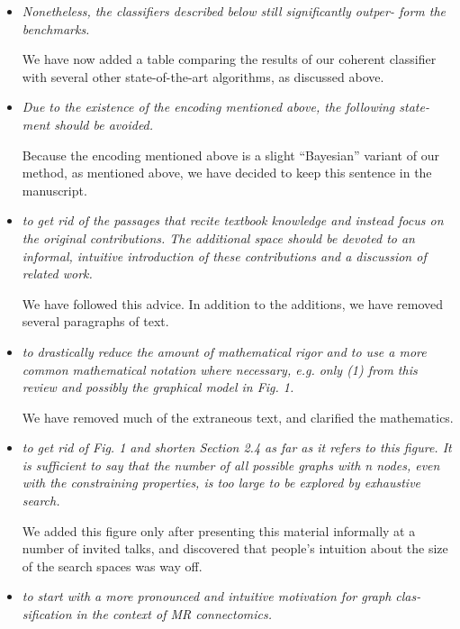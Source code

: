 \documentclass[11pt]{article}
\begin{document}
\begin{itemize}
	.
	
	
	\item \emph{Nonetheless, the classifiers described below still significantly outper- form the benchmarks.}
	
	We have now added a table comparing the results of our coherent classifier with several other state-of-the-art algorithms, as discussed above.
	
	\item \emph{Due to the existence of the encoding mentioned above, the following state- ment should be avoided.}
	
		Because the encoding mentioned above is a slight ``Bayesian'' variant of our method, as mentioned above, we have decided to keep this sentence in the manuscript.
		
	\item \emph{to get rid of the passages that recite textbook knowledge and instead focus on the original contributions. The additional space should be devoted to an informal, intuitive introduction of these contributions and a discussion of related work.}
	
	We have followed this advice.  In addition to the additions, we have removed several paragraphs of text.
	
	\item \emph{to drastically reduce the amount of mathematical rigor and to use a more common mathematical notation where necessary, e.g. only (1) from this review and possibly the graphical model in Fig. 1.}
	
	We have removed much of the extraneous text, and clarified the mathematics.
	
	\item \emph{to get rid of Fig. 1 and shorten Section 2.4 as far as it refers to this figure. It is sufficient to say that the number of all possible graphs with n nodes, even with the constraining properties, is too large to be explored by exhaustive search.}
	
	We added this figure only after presenting this material informally at a number of invited talks, and discovered that people's intuition about the size of the search spaces was way off.
	
	\item \emph{to start with a more pronounced and intuitive motivation for graph clas- sification in the context of MR connectomics.}
	

\end{itemize}
\end{document}
